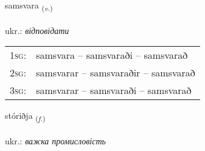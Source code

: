\documentclass[frontgrid, backgrid]{flacards}\usepackage[]{graphicx}\usepackage[]{xcolor}
\begin{document}
\renewcommand{\flhead}{\vskip5pt \fboxsep=0pt {\small\bfseries\footnotesize Sagnorð | дієслово}}
\renewcommand{\fcfoot}{\vskip5pt \fboxsep=0pt \hspace{2pt}{\small\bfseries\footnotesize 3K}}

\renewcommand{\blhead}{\vskip5pt {\small\bfseries\footnotesize Sagnorð | дієслово }}
\renewcommand{\bcfoot}{\vskip5pt \hspace{2pt}{\small\bfseries\footnotesize 3K}}


{samsvara \small{\textsubscript{(\textit{v.})}} \\[1ex] %
\textphonetic{[samsvara]} \\
ukr.: \emph{відповідати} \\  [2ex]
\renewcommand*{\arraystretch}{0.8}
\begin{tabular}{p{1cm}l}
\textsc{1sg}: & samsvara -- samsvaraði -- samsvarað \\ 
\textsc{2sg}: & samsvarar -- samsvaraðir -- samsvarað \\ 
\textsc{3sg}: & samsvarar -- samsvaraði -- samsvarað \\ 
\end{tabular}
}

\renewcommand{\flhead}{\vskip5pt \fboxsep=0pt {\small\bfseries\footnotesize Nafnorð | іменник}}
\renewcommand{\fcfoot}{\vskip5pt \fboxsep=0pt \hspace{2pt}{\small\bfseries\footnotesize 3K}}

\renewcommand{\blhead}{\vskip5pt {\small\bfseries\footnotesize Nafnorð | іменник }}
\renewcommand{\bcfoot}{\vskip5pt \hspace{2pt}{\small\bfseries\footnotesize 3K}}


{stóriðja \small{\textsubscript{(\textit{f.})}} \\[1ex] %
\textphonetic{[stouːrɪðja]} \\
ukr.: \emph{важка промисловість} \\  [2ex]
\renewcommand*{\arraystretch}{0.8}
}
\end{document}
